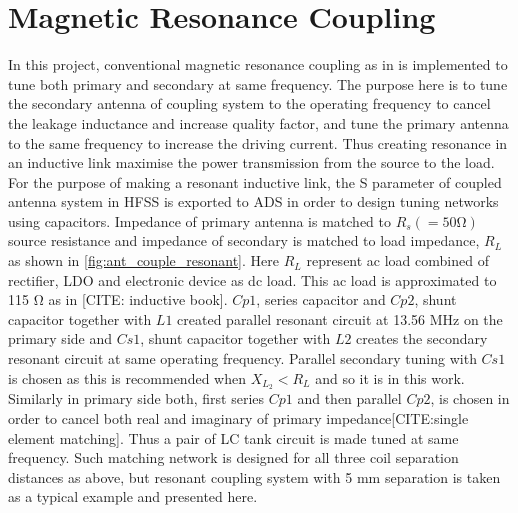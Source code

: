 \documentclass[UKenglish]{ifimaster}  %
\begin{document}
\section{Magnetic Resonance Coupling}  	%

In this project, conventional magnetic resonance coupling as in is implemented to tune both primary and secondary 
at same frequency. The purpose here is to tune the secondary antenna of 
coupling system to the operating frequency to cancel the leakage inductance and increase quality factor, and tune the primary antenna to the same frequency to increase the 
driving current. Thus creating resonance in an inductive link maximise the power transmission from the source to  the load.  \\


For the purpose of making a resonant inductive link, the S parameter of coupled antenna system in HFSS 
is exported to ADS in order to design tuning networks using capacitors. Impedance of  primary antenna is 
matched to $ R_{s}(=50 \si{\ohm}) $ source resistance and impedance of secondary is matched to load impedance, 
$R_{L}$ as shown in \ref{fig:ant_couple_resonant}. Here $R_{L}$ represent ac load combined of rectifier, LDO and electronic device as dc load. This ac load 
is approximated to 115 \si{\ohm} as in [CITE: inductive book]. $Cp1$, series capacitor and $Cp2$, shunt capacitor together 
with $L1$ created parallel resonant circuit at 13.56 MHz on the primary side and $Cs1$, shunt capacitor together with $L2$ 
creates the secondary resonant circuit at same operating frequency. Parallel secondary tuning with $Cs1$ is chosen as this is 
recommended when $X_{L_{2}} < R_{L}$ and so it is in this work. Similarly in primary side both, first series 
$Cp1$ and then parallel $Cp2$, is chosen in order to cancel both real and imaginary of primary impedance[CITE:single element matching]. Thus a pair of LC tank circuit is made tuned at same 
frequency. Such matching network is designed for all three coil separation distances as above, but resonant coupling system 
with 5 mm separation is taken as a typical example and presented here. \\
\end{document}
